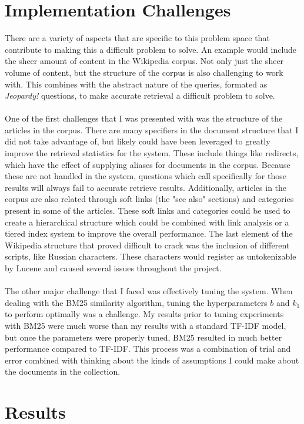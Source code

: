 \documentclass{article}%
\begin{document}
\section*{Implementation Challenges}
There are a variety of aspects that are specific to this problem space that contribute to making this a difficult problem to solve. An
example would include the sheer amount of content in the Wikipedia corpus. Not only just the sheer volume of content, but the structure
of the corpus is also challenging to work with. This combines with the abstract nature of the queries, formated as \textit{Jeopardy!}
questions, to make accurate retrieval a difficult problem to solve.\\
\\
One of the first challenges that I was presented with was the structure of the articles in the corpus. There are many specifiers in the
document structure that I did not take advantage of, but likely could have been leveraged to greatly improve the retrieval statistics
for the system. These include things like redirects, which have the effect of supplying aliases for documents in the corpus. Because
these are not handled in the system, questions which call specifically for those results will always fail to accurate retrieve
results. Additionally, articles in the corpus are also related through soft links (the "see also" sections) and categories present
in some of the articles. These soft links and categories could be used to create a hierarchical structure which could be combined
with link analysis or a tiered index system to improve the overall performance. The last element of the Wikipedia structure that
proved difficult to crack was the inclusion of different scripts, like Russian characters. These characters would register as
untokenizable by Lucene and caused several issues throughout the project.\\
\\
The other major challenge that I faced was effectively tuning the system. When dealing with the BM25 similarity algorithm, tuning the
hyperparameters $b$ and $k_1$ to perform optimally was a challenge. My results prior to tuning experiments with BM25 were much worse than
my results with a standard TF-IDF model, but once the parameters were properly tuned, BM25 resulted in much better performance compared
to TF-IDF. This process was a combination of trial and error combined with thinking about the kinds of assumptions I could make about
the documents in the collection.

\section*{Results}
\end{document}
